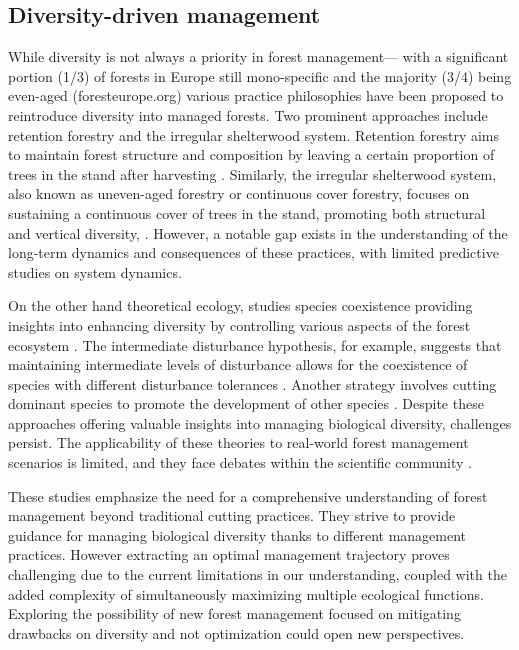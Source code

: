 \documentclass{article}
\begin{document}
\subsection{Diversity-driven management}

While diversity is not always a priority in forest management— with a significant portion (1/3) of forests in Europe still mono-specific and the majority (3/4) being even-aged (foresteurope.org) various practice philosophies have been proposed to reintroduce diversity into managed forests. Two prominent approaches include retention forestry and the irregular shelterwood system.
Retention forestry aims to maintain forest structure and composition by leaving a certain proportion of trees in the stand after harvesting \autocite{gustafssonRetentionForestryMaintain2012,rosenvaldWhatWhenWhere2008}. Similarly, the irregular shelterwood system, also known as uneven-aged forestry or continuous cover forestry, focuses on sustaining a continuous cover of trees in the stand, promoting both structural and vertical diversity, \autocite{sinhaOptimalManagementNaturally2017,schallImpactEvenagedUnevenaged2018,nylandEvenUnevenagedChallenges2003,noletComparingEffectsEven2018,dudumanForestManagementPlanning2011}. However, a notable gap exists in the understanding of the long-term dynamics and consequences of these practices, with limited predictive studies on system dynamics.

On the other hand theoretical ecology, studies species coexistence providing insights into enhancing diversity by controlling various aspects of the forest ecosystem \autocite{wilsonTwelveTheoriesCoexistence2011}. The intermediate disturbance hypothesis, for example, suggests that maintaining intermediate levels of disturbance allows for the coexistence of species with different disturbance tolerances \autocite{connellDiversityTropicalRain1978,sheilDefiningDefendingConnell2013}. Another strategy involves cutting dominant species to promote the development of other species \autocite{pichancourtGrowingBiodiverseCarbonrich2014}.
Despite these approaches offering valuable insights into managing biological diversity, challenges persist. The applicability of these theories to real-world forest management scenarios is limited, and they face debates within the scientific community \autocite{mackeyReexaminationExpectedEffects2000,foxIntermediateDisturbanceHypothesis2013}.

These studies emphasize the need for a comprehensive understanding of forest management beyond traditional cutting practices. They strive to provide guidance for managing biological diversity thanks to different management practices. However extracting an optimal management trajectory proves challenging due to the current limitations in our understanding, coupled with the added complexity of simultaneously maximizing multiple ecological functions. Exploring the possibility of new forest management focused on mitigating drawbacks on diversity and not optimization could open new perspectives.\\
\end{document}
